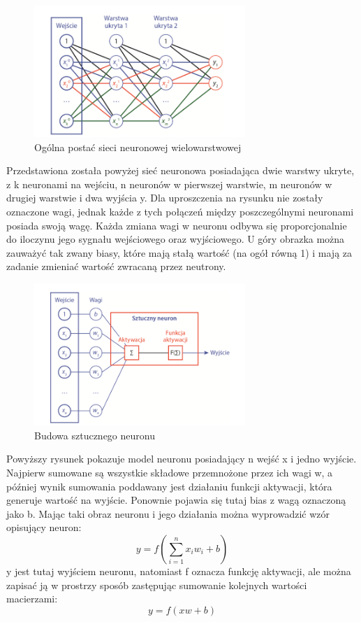 \documentclass[a4paper, 12pt]{report}
\begin{document}
\begin{figure}[hbt!]
\includegraphics[width=8cm]{Sieci}
\centering
\caption{Ogólna postać sieci neuronowej wielowarstwowej\cite {book2}}
\end{figure}
Przedstawiona została powyżej sieć neuronowa posiadająca dwie warstwy ukryte, z k neuronami na wejściu, n neuronów w pierwszej warstwie, m neuronów w drugiej warstwie i dwa wyjścia y. Dla uproszczenia na rysunku nie zostały oznaczone wagi, jednak każde z tych połączeń między poszczególnymi neuronami posiada swoją wagę. Każda zmiana wagi w neuronu odbywa się proporcjonalnie do iloczynu jego sygnału wejściowego oraz wyjściowego. U góry obrazka można zauważyć tak zwany biasy, które mają stałą wartość (na ogół równą 1) i mają za zadanie zmieniać wartość zwracaną przez neutrony.
\newpage

\begin{figure}[t!]
\includegraphics[width=8cm]{Neuron}
\centering
\caption{Budowa sztucznego neuronu\cite {book2}}
\end{figure}
Powyższy rysunek pokazuje model neuronu posiadający n wejść x i jedno wyjście. Najpierw sumowane są wszystkie składowe przemnożone przez ich wagi w, a później wynik sumowania poddawany jest działaniu funkcji aktywacji, która generuje wartość na wyjście. Ponownie pojawia się tutaj bias z wagą oznaczoną jako b. Mając taki obraz neuronu i jego działania można wyprowadzić wzór opisujący neuron:
\[
y = f \left( {\sum_{i=1}^{n}  x_i w_i + b } \right)
\]
y jest tutaj wyjściem neuronu, natomiast f oznacza funkcję aktywacji, ale można zapisać ją w prostrzy sposób zastępując sumowanie kolejnych wartości macierzami:
\[
y = f \left( {xw + b } \right)
\]
\end{document}
